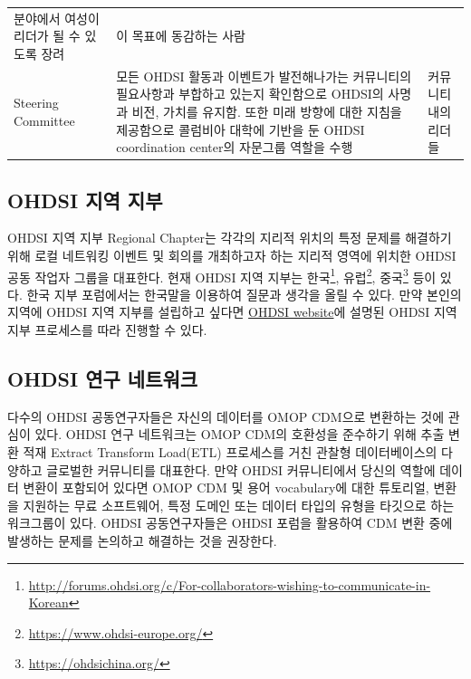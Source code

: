 \documentclass[10.5pt]{book}
\let\rmarkdownfootnote\footnote%
\def\footnote{\protect\rmarkdownfootnote}
\theoremstyle{definition}
\theoremstyle{definition}
\theoremstyle{definition}
\theoremstyle{remark}
\begin{document}
\begin{longtable}[]{@{}lll@{}}
\begin{minipage}[t]{0.44\columnwidth}
분야에서 여성이 리더가 될 수 있도록 장려\strut
\end{minipage} & \begin{minipage}[t]{0.37\columnwidth}\raggedright\strut
이 목표에 동감하는 사람\strut
\end{minipage}\tabularnewline
\begin{minipage}[t]{0.11\columnwidth}\raggedright\strut
Steering Committee\strut
\end{minipage} & \begin{minipage}[t]{0.44\columnwidth}\raggedright\strut
모든 OHDSI 활동과 이벤트가 발전해나가는 커뮤니티의 필요사항과 부합하고
있는지 확인함으로 OHDSI의 사명과 비전, 가치를 유지함. 또한 미래 방향에
대한 지침을 제공함으로 콜럼비아 대학에 기반을 둔 OHDSI coordination
center의 자문그룹 역할을 수행\strut
\end{minipage} & \begin{minipage}[t]{0.37\columnwidth}\raggedright\strut
커뮤니티 내의 리더들\strut
\end{minipage}\tabularnewline
\bottomrule
\end{longtable}

\subsection{OHDSI 지역 지부}\label{ohdsi--}

OHDSI 지역 지부 Regional Chapter는 각각의 지리적 위치의 특정 문제를
해결하기 위해 로컬 네트워킹 이벤트 및 회의를 개최하고자 하는 지리적
영역에 위치한 OHDSI 공동 작업자 그룹을 대표한다. 현재 OHDSI 지역 지부는
한국\footnote{\url{http://forums.ohdsi.org/c/For-collaborators-wishing-to-communicate-in-Korean}},
유럽\footnote{\url{https://www.ohdsi-europe.org/}}, 중국\footnote{\url{https://ohdsichina.org/}}
등이 있다. 한국 지부 포럼에서는 한국말을 이용하여 질문과 생각을 올릴 수
있다. 만약 본인의 지역에 OHDSI 지역 지부를 설립하고 싶다면
\href{https://www.ohdsi.org/who-we-are/regional-chapters}{OHDSI
website}에 설명된 OHDSI 지역 지부 프로세스를 따라 진행할 수 있다.

\subsection{OHDSI 연구 네트워크}\label{ohdsi--}

다수의 OHDSI 공동연구자들은 자신의 데이터를 OMOP CDM으로 변환하는 것에
관심이 있다. OHDSI 연구 네트워크는 OMOP CDM의 호환성을 준수하기 위해
추출 변환 적재 Extract Transform Load(ETL) 프로세스를 거친 관찰형
데이터베이스의 다양하고 글로벌한 커뮤니티를 대표한다. 만약 OHDSI
커뮤니티에서 당신의 역할에 데이터 변환이 포함되어 있다면 OMOP CDM 및
용어 vocabulary에 대한 튜토리얼, 변환을 지원하는 무료 소프트웨어, 특정
도메인 또는 데이터 타입의 유형을 타깃으로 하는 워크그룹이 있다. OHDSI
공동연구자들은 OHDSI 포럼을 활용하여 CDM 변환 중에 발생하는 문제를
논의하고 해결하는 것을 권장한다.
\end{document}

